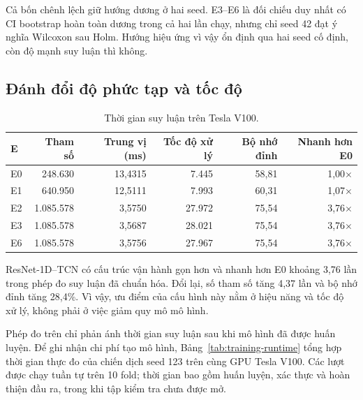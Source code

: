 \documentclass[10pt,a4paper]{article}
\begin{document}
Cả bốn chênh lệch giữ hướng dương ở hai seed. E3--E6 là đối chiếu duy nhất có CI bootstrap hoàn toàn dương trong cả hai lần chạy, nhưng chỉ seed 42 đạt ý nghĩa Wilcoxon sau Holm. Hướng hiệu ứng vì vậy ổn định qua hai seed cố định, còn độ mạnh suy luận thì không.

\subsection{Đánh đổi độ phức tạp và tốc độ}

\begin{table}[t]
\centering
\caption{Thời gian suy luận trên Tesla V100.}
\label{tab:complexity}
\small
\begin{tabular}{lrrrrr}
\toprule
\textbf{E} & \textbf{Tham số} & \textbf{Trung vị (ms)} & \textbf{Tốc độ xử lý} & \textbf{Bộ nhớ đỉnh} & \textbf{Nhanh hơn E0} \\
\midrule
E0 & 248.630 & 13,4315 & 7.445 & 58,81 & 1,00$\times$ \\
E1 & 640.950 & 12,5111 & 7.993 & 60,31 & 1,07$\times$ \\
E2 & 1.085.578 & 3,5750 & 27.972 & 75,54 & 3,76$\times$ \\
E3 & 1.085.578 & 3,5687 & 28.021 & 75,54 & 3,76$\times$ \\
E6 & 1.085.578 & 3,5756 & 27.967 & 75,54 & 3,76$\times$ \\
\bottomrule
\end{tabular}
\end{table}

ResNet-1D--TCN có cấu trúc vận hành gọn hơn và nhanh hơn E0 khoảng 3,76 lần trong phép đo suy luận đã chuẩn hóa. Đổi lại, số tham số tăng 4,37 lần và bộ nhớ đỉnh tăng 28,4\%. Vì vậy, ưu điểm của cấu hình này nằm ở hiệu năng và tốc độ xử lý, không phải ở việc giảm quy mô mô hình.

Phép đo trên chỉ phản ánh thời gian suy luận sau khi mô hình đã được huấn luyện. Để ghi nhận chi phí tạo mô hình, Bảng~\ref{tab:training-runtime} tổng hợp thời gian thực đo của chiến dịch seed 123 trên cùng GPU Tesla V100. Các lượt được chạy tuần tự trên 10 fold; thời gian bao gồm huấn luyện, xác thực và hoàn thiện đầu ra, trong khi tập kiểm tra chưa được mở.
\end{document}
